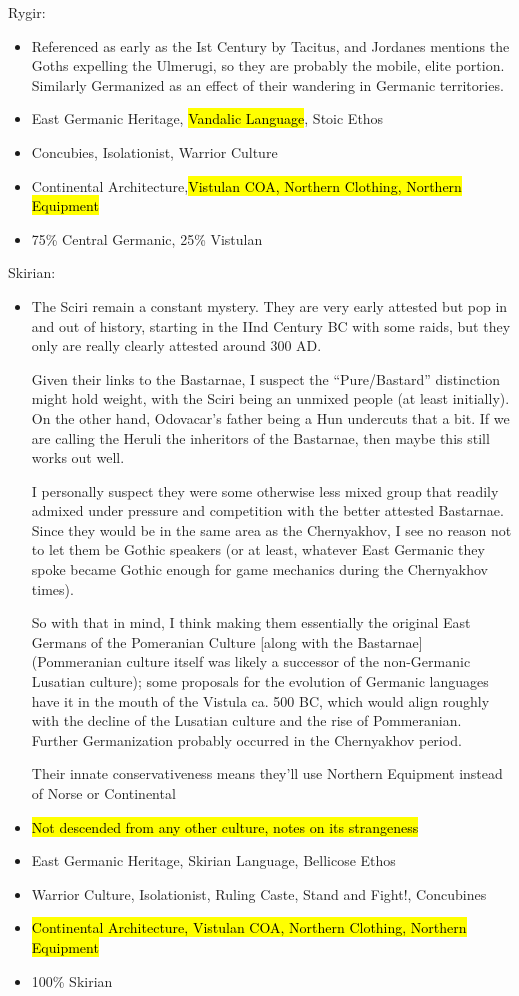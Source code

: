 \documentclass{article}
\begin{document}
	Rygir:
	\begin{itemize}
		\item Referenced as early as the Ist Century by Tacitus, and Jordanes mentions the Goths expelling the Ulmerugi, so they are probably the mobile, elite portion. Similarly Germanized as an effect of their wandering in Germanic territories.
		\item East Germanic Heritage, \hl{Vandalic Language}, Stoic Ethos
		\item Concubies, Isolationist, Warrior Culture
		\item Continental Architecture,\hl{Vistulan COA, Northern Clothing, Northern Equipment}
		\item 75\% Central Germanic, 25\% Vistulan
	\end{itemize}
	
	Skirian:
	\begin{itemize}
		\item The Sciri remain a constant mystery. They are very early attested but pop in and out of history, starting in the IInd Century BC with some raids, but they only are really clearly attested around 300 AD. 
		
		Given their links to the Bastarnae, I suspect the “Pure/Bastard” distinction might hold weight, with the Sciri being an unmixed people (at least initially). On the other hand, Odovacar’s father being a Hun undercuts that a bit.
		If we are calling the Heruli the inheritors of the Bastarnae, then maybe this still works out well.
		
		I personally suspect they were some otherwise less mixed group that readily admixed under pressure and competition with the better attested Bastarnae.
		Since they would be in the same area as the Chernyakhov, I see no reason not to let them be Gothic speakers (or at least, whatever East Germanic they spoke became Gothic enough for game mechanics during the Chernyakhov times).
		
		So with that in mind, I think making them essentially the original East Germans of the Pomeranian Culture [along with the Bastarnae] (Pommeranian culture itself was likely a successor of the non-Germanic Lusatian culture); some proposals for the evolution of Germanic languages have it in the mouth of the Vistula ca. 500 BC, which would align roughly with the decline of the Lusatian culture and the rise of Pommeranian.
		Further Germanization probably occurred in the Chernyakhov period.
		
		Their innate conservativeness means they’ll use Northern Equipment instead of Norse or Continental
		\item \hl{Not descended from any other culture, notes on its strangeness}
		\item East Germanic Heritage, Skirian Language, Bellicose Ethos
		\item Warrior Culture, Isolationist, Ruling Caste, Stand and Fight!, Concubines
		\item \hl{Continental Architecture, Vistulan COA, Northern Clothing, Northern Equipment}
		\item 100\% Skirian
	\end{itemize}
	
\end{document}
